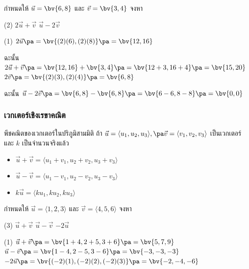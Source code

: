 \begin{frame}[t]
\begin{ex}{}
กำหนดให้ $\vec{u} = \bv{6,8}$ และ $\vec{v} = \bv{3,4}$ จงหา
\begin{tasks}(2)
\task $2\vec{u} + \vec{v}$
\task $\vec{u} - 2\vec{v}$
\end{tasks}
\end{ex}
\begin{sol}
\begin{tasks}(1)
\task$2\vec{u} \pa = \bv{(2)(6), (2)(8)} \pa = \bv{12, 16}$  \pa

ฉะนั้น $2\vec{u} + \vec{v} \pa = \bv{12, 16} + \bv{3,4} \pa = \bv{12+3, 16+4} \pa = \bv{15, 20}$ \pa
\task $2\vec{v}  \pa = \bv{(2)(3), (2)(4)} \pa = \bv{6, 8}$ \pa

ฉะนั้น $\vec{u} - 2\vec{v} \pa = \bv{6,8} - \bv{6,8} \pa = \bv{6-6, 8-8} \pa = \bv{0,0}$
\end{tasks}
\end{sol}
\end{frame}

\begin{frame}
\frametitle{เวกเตอร์เชิงเรขาคณิต}
\begin{defn}{}{พีชคณิตของเวกเตอร์ในปริภูมิสามมิติ}
ถ้า $\vec{u} = \langle u_1, u_2, u_3 \rangle, \pa \vec{v} = \langle v_1, v_2, v_3 \rangle$ \pa เป็นเวกเตอร์ และ $k$ เป็นจำนวนจริงแล้ว \pa
\begin{itemize}
\item $\vec{u} + \vec{v} = \langle u_1 + v_1, u_2 + v_2, u_3 + v_3 \rangle$ \pa
\item $\vec{u} - \vec{v} = \langle u_1 - v_1, u_2 - v_2, u_3 - v_3 \rangle$ \pa
\item $k \vec{u} = \langle ku_1, ku_2, ku_3 \rangle$
\end{itemize}
\end{defn}
\end{frame}

\begin{frame}[t]
\begin{ex}{}
กำหนดให้ $\vec{u} = \langle 1,2,3 \rangle$ และ $\vec{v} = \langle 4,5,6 \rangle$ จงหา
\begin{tasks}(3)
\task $\vec{u} + \vec{v}$
\task $\vec{u} - \vec{v}$
\task $-2\vec{u}$
\end{tasks}
\end{ex}
\begin{sol}
\begin{tasks}(1)
\task $\vec{u} + \vec{v} \pa = \bv{1+4, 2+5, 3+6}  \pa = \bv{5,7,9}$ \pa
\task $\vec{u} - \vec{v}  \pa = \bv{1-4, 2-5, 3-6} \pa = \bv{-3, -3, -3}$\pa
\task $-2 \vec{u} \pa = \bv{(-2)(1), (-2)(2), (-2)(3)} \pa = \bv{-2, -4, -6}$
\end{tasks}
\end{sol}
\end{frame}


